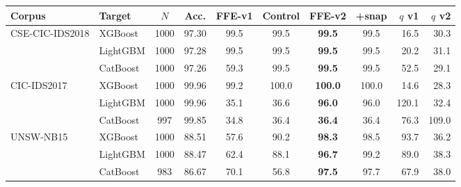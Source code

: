 \begin{tabular}{@{}llccccccrr@{}}
\toprule
\textbf{Corpus} & \textbf{Target} & \textbf{$N$} & \textbf{Acc.} & \textbf{FFE-v1} & \textbf{Control} & \textbf{FFE-v2} & \textbf{+snap} & \textbf{$q$ v1} & \textbf{$q$ v2} \\
\midrule
CSE-CIC-IDS2018 & XGBoost & 1000 & 97.30 & 99.5 & 99.5 & \textbf{99.5} & 99.5 & 16.5 & 30.3 \\
 & LightGBM & 1000 & 97.28 & 99.5 & 99.5 & \textbf{99.5} & 99.5 & 20.2 & 31.1 \\
 & CatBoost & 1000 & 97.26 & 59.3 & 99.5 & \textbf{99.5} & 99.5 & 52.5 & 29.1 \\
\midrule
CIC-IDS2017 & XGBoost & 1000 & 99.96 & 99.2 & 100.0 & \textbf{100.0} & 100.0 & 14.6 & 28.3 \\
 & LightGBM & 1000 & 99.96 & 35.1 & 36.6 & \textbf{96.0} & 96.0 & 120.1 & 32.4 \\
 & CatBoost & 997 & 99.85 & 34.8 & 36.4 & \textbf{36.4} & 36.4 & 76.3 & 109.0 \\
\midrule
UNSW-NB15 & XGBoost & 1000 & 88.51 & 57.6 & 90.2 & \textbf{98.3} & 98.5 & 93.7 & 36.2 \\
 & LightGBM & 1000 & 88.47 & 62.4 & 88.1 & \textbf{96.7} & 99.2 & 89.0 & 38.3 \\
 & CatBoost & 983 & 86.67 & 70.1 & 56.8 & \textbf{97.5} & 97.7 & 67.9 & 38.0 \\
\bottomrule
\end{tabular}
